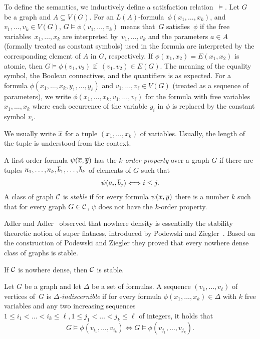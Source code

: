 To define the semantics, we inductively define a satisfaction
relation~$\models$. Let $G$ be a graph and $A\subseteq V(G)$. For an
$L(A)$-formula~$\phi(x_1,\ldots,x_k)$, and
$v_1,\ldots,v_k\in V(G)$, $G\models\phi(v_1,\ldots,v_k)$
means that~$G$ satisfies~$\phi$ if the free variables~$x_1,\ldots,x_k$
are interpreted by~$v_1,\ldots,v_k$ and the parameters $a\in A$
(formally treated as constant symbols) used in the formula are
interpreted by the corresponding element of $A$ in $G$, respectively. If
$\phi(x_1,x_2)=E(x_1,x_2)$ is atomic, then $G\models\phi(v_1,v_2)$
if~$(v_1,v_2)\in E(G)$. The meaning of the equality symbol, the
Boolean connectives, and the quantifiers is as expected. For a
formula $\phi(x_1,\ldots, x_k, y_1,\ldots, y_\ell)$ and
$v_1,\ldots, v_\ell\in V(G)$ (treated as a sequence of parameters), we
write $\phi(x_1,\ldots, x_k, v_1,\ldots, v_\ell)$ for the formula with
free variables $x_1,\ldots, x_k$ where each occurrence of the variable
$y_i$ in $\phi$ is replaced by the constant symbol $v_i$.

We usually write $\overline{x}$ for a tuple $(x_1,\ldots, x_k)$ of variables. 
Usually, the length of the tuple is understood from the context. 

A first-order formula $\psi(\overline{x},\overline{y})$ has the \emph{$k$-order property}
over a graph $G$ if there are tuples $\overline{a}_1,\ldots, \overline{a}_k, \overline{b}_1,\ldots, \overline{b}_k$
of elements of $G$ such that \[\psi(\overline{a}_i,\overline{b}_j)\Longleftrightarrow i\leq j.\]
A class of graph $\mathcal{C}$ is \emph{stable} if for every formula $\psi(\overline{x},\overline{y})$ there
is a number $k$ such that for every graph $G\in \mathcal{C}$, $\psi$ does not have the $k$-order 
property.

Adler and Adler~\cite{adler2014interpreting} observed that nowhere density 
is essentially the stability theoretic notion of super flatness, introduced by
Podewski and Ziegler~\cite{podewski1978stable}. Based on the construction of 
Podewski and Ziegler they proved that every nowhere dense class of graphs is
stable. 

\begin{theorem}\label{thm:adleradler}
If $\mathcal{C}$ is nowhere dense, then $\mathcal{C}$ is stable. 
\end{theorem}

Let $G$ be a graph and let $\Delta$ be a set of formulas. A sequence
$(v_1,\ldots, v_\ell)$ of vertices of~$G$ is
\emph{$\Delta$-indiscernible} if for every formula
$\phi(x_1,\ldots, x_k)\in \Delta$ with $k$ free variables and any two
increasing sequences
$1\leq i_1<\ldots <i_k\leq \ell, 1\leq j_1< \ldots< j_k\leq \ell$ of
integers, it holds that
\[G\models\phi(v_{i_1},\ldots, v_{i_k})\Leftrightarrow G\models\phi(v_{j_1},
\ldots, v_{j_k}).\]

